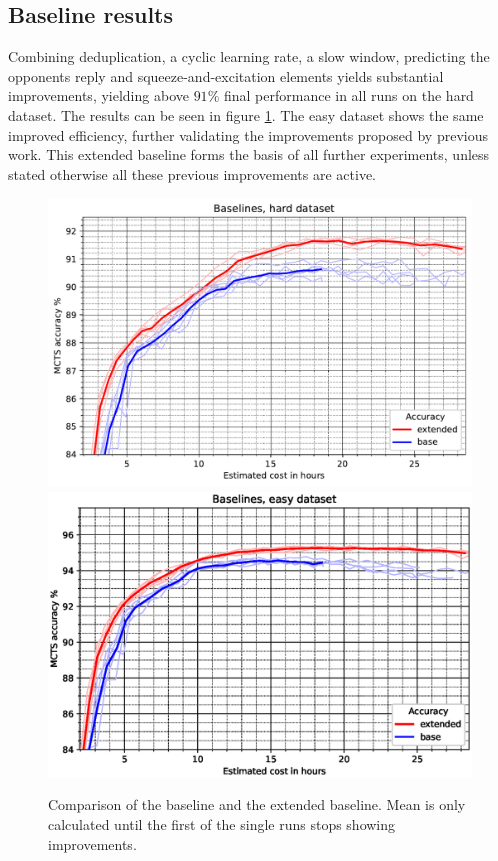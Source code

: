 \documentclass[12pt,onecolumn,oneside,titlepage]{article}
\begin{document}
\subsection{Baseline results}

Combining deduplication, a cyclic learning rate, a slow window, predicting the opponents reply and squeeze-and-excitation elements yields substantial improvements, yielding above $91\%$ final performance in all runs on the hard dataset. The results can be seen in figure \ref{fig:baseline_compare}.
The easy dataset shows the same improved efficiency, further validating the improvements proposed by previous work.
This extended baseline forms the basis of all further experiments, unless stated otherwise all these previous improvements are active.

\begin{figure}[H]
\centering
\includegraphics[clip,width=\columnwidth]{baseline_ex}
\includegraphics[clip,width=\columnwidth]{baseline_ex_easy_dataset}
\caption{Comparison of the baseline and the extended baseline. Mean is only calculated until the first of the single runs stops showing improvements.}
\label{fig:baseline_compare}
\end{figure}
\end{document}
